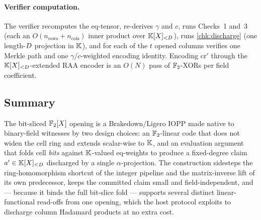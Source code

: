 \paragraph{Verifier computation.} The verifier recomputes the eq-tensor,
re-derives $\gamma$ and $c$, runs Checks~1 and~3 (each an
$O(n_{\mathrm{rows}}+n_{\mathrm{cols}})$ inner product over $\mathbb{K}[X]_{<D}$),
runs \ref{chk:discharge} (one length-$D$ projection in $\mathbb{K}$), and for each of the
$t$ opened columns verifies one Merkle path and one $\gamma$/$c$-weighted
encoding identity. Encoding $\mathrm{cr}'$ through the $\mathbb{K}[X]_{<D}$-extended
RAA encoder is an $O(N)$ pass of $\mathbb{F}_2$-XORs per field coefficient.

\subsection{Summary}

The bit-sliced $\mathbb{F}_2[X]$ opening is a Brakedown/Ligero IOPP made native
to binary-field witnesses by two design choices: an $\mathbb{F}_2$-linear code
that does not widen the cell ring and extends scalar-wise to $\mathbb{K}$, and an
evaluation argument that folds cell \emph{bits} against $\mathbb{K}$-valued
eq-weights to produce a fixed-degree claim $a' \in \mathbb{K}[X]_{<D}$ discharged by
a single $\alpha$-projection. The construction sidesteps the
ring-homomorphism shortcut of the integer pipeline and the matrix-inverse
lift of its own predecessor, keeps the committed claim small and
field-independent, and --- because it binds the full bit-slice fold ---
supports several distinct linear-functional read-offs from one opening,
which the host protocol exploits to discharge column Hadamard products at
no extra cost.
